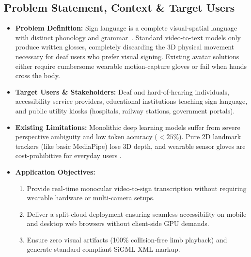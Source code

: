 \documentclass[11pt, a4paper]{article}
\begin{document}
\subsection{Problem Statement, Context \& Target Users}
\begin{itemize}[noitemsep, topsep=2pt]
    \item \textbf{Problem Definition:} Sign language is a complete visual-spatial language with distinct phonology and grammar~\cite{stokoe2005}. Standard video-to-text models only produce written glosses, completely discarding the 3D physical movement necessary for deaf users who prefer visual signing. Existing avatar solutions either require cumbersome wearable motion-capture gloves or fail when hands cross the body.
    \item \textbf{Target Users \& Stakeholders:} Deaf and hard-of-hearing individuals, accessibility service providers, educational institutions teaching sign language, and public utility kiosks (hospitals, railway stations, government portals).
    \item \textbf{Existing Limitations:} Monolithic deep learning models suffer from severe perspective ambiguity and low token accuracy ($<25\%$). Pure 2D landmark trackers (like basic MediaPipe) lose 3D depth, and wearable sensor gloves are cost-prohibitive for everyday users \cite{skobov2020,li2020wlasl}.
    \item \textbf{Application Objectives:}
    \begin{enumerate}[noitemsep, topsep=2pt]
        \item Provide real-time monocular video-to-sign transcription without requiring wearable hardware or multi-camera setups.
        \item Deliver a split-cloud deployment ensuring seamless accessibility on mobile and desktop web browsers without client-side GPU demands.
        \item Ensure zero visual artifacts (100\% collision-free limb playback) and generate standard-compliant SiGML XML markup.
    \end{enumerate}
\end{itemize}
\end{document}

